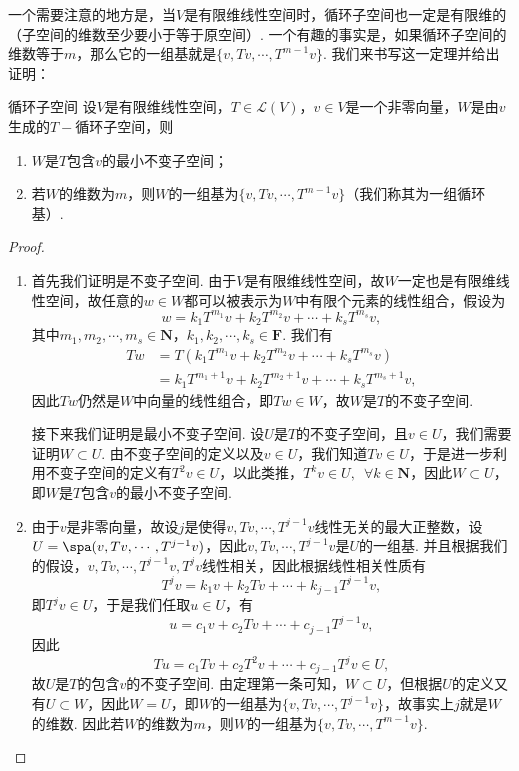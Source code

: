 一个需要注意的地方是，当$V$是有限维线性空间时，循环子空间也一定是有限维的（子空间的维数至少要小于等于原空间）. 一个有趣的事实是，如果循环子空间的维数等于$m$，那么它的一组基就是$\{v,Tv,\cdots,T^{m-1}v\}$. 我们来书写这一定理并给出证明：
\begin{theorem}{}{循环子空间}
    设$V$是有限维线性空间，$T\in\mathcal{L}(V)$，$v\in V$是一个非零向量，$W$是由$v$生成的$T-\text{循环子空间}$，则
    \begin{enumerate}
        \item $W$是$T$包含$v$的最小不变子空间；
        \item 若$W$的维数为$m$，则$W$的一组基为$\{v,Tv,\cdots,T^{m-1}v\}$（我们称其为一组循环基）.
    \end{enumerate}
\end{theorem}
\begin{proof}
    \begin{enumerate}
        \item 首先我们证明是不变子空间. 由于$V$是有限维线性空间，故$W$一定也是有限维线性空间，故任意的$w\in W$都可以被表示为$W$中有限个元素的线性组合，假设为
              \[w=k_1T^{m_1}v+k_2T^{m_2}v+\cdots+k_sT^{m_s}v,\]
              其中$m_1,m_2,\cdots,m_s\in\mathbf{N}$，$k_1,k_2,\cdots,k_s\in\mathbf{F}$. 我们有
              \[\begin{aligned}
                      Tw & =T(k_1T^{m_1}v+k_2T^{m_2}v+\cdots+k_sT^{m_s}v)     \\
                         & =k_1T^{m_1+1}v+k_2T^{m_2+1}v+\cdots+k_sT^{m_s+1}v,
                  \end{aligned}\]
              因此$Tw$仍然是$W$中向量的线性组合，即$Tw\in W$，故$W$是$T$的不变子空间.

              接下来我们证明是最小不变子空间. 设$U$是$T$的不变子空间，且$v\in U$，我们需要证明$W\subset U$. 由不变子空间的定义以及$v\in U$，我们知道$Tv\in U$，于是进一步利用不变子空间的定义有$T^2v\in U$，以此类推，$T^kv\in U,\enspace\forall k\in\mathbf{N}$，因此$W\subset U$，即$W$是$T$包含$v$的最小不变子空间.

        \item 由于$v$是非零向量，故设$j$是使得$v,Tv,\cdots,T^{j-1}v$线性无关的最大正整数，设$U=\spa(v,Tv,\cdots,T^{j-1}v)$，因此$v,Tv,\cdots,T^{j-1}v$是$U$的一组基. 并且根据我们的假设，$v,Tv,\cdots,T^{j-1}v,T^jv$线性相关，因此根据线性相关性质有
              \[T^jv=k_1v+k_2Tv+\cdots+k_{j-1}T^{j-1}v,\]
              即$T^jv\in U$，于是我们任取$u\in U$，有
              \[u=c_1v+c_2Tv+\cdots+c_{j-1}T^{j-1}v,\]
              因此
              \[Tu=c_1Tv+c_2T^2v+\cdots+c_{j-1}T^jv\in U,\]
              故$U$是$T$的包含$v$的不变子空间. 由定理第一条可知，$W\subset U$，但根据$U$的定义又有$U\subset W$，因此$W=U$，即$W$的一组基为$\{v,Tv,\cdots,T^{j-1}v\}$，故事实上$j$就是$W$的维数. 因此若$W$的维数为$m$，则$W$的一组基为$\{v,Tv,\cdots,T^{m-1}v\}$.
    \end{enumerate}
\end{proof}


